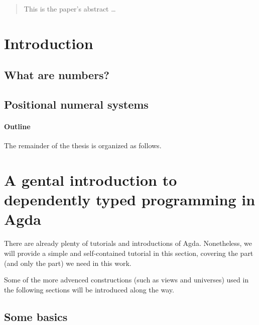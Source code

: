\documentclass[12pt, a4paper]{article}
\begin{document}
\maketitle

\begin{abstract}
This is the paper's abstract \ldots
\end{abstract}

\section{Introduction}


\subsection{What are numbers?}\label{num}


\subsection{Positional numeral systems}\label{pos}


\paragraph{Outline}
The remainder of the thesis is organized as follows.

\section{A gental introduction to dependently typed programming in Agda}\label{agda}

There are already plenty of tutorials and introductions of Agda\cite{norell2009dependently}.
Nonetheless, we will provide a simple and self-contained tutorial in this section,
covering the part (and only the part) we need in this work.

Some of the more advenced constructions (such as views and universes) used in
the following sections will be introduced along the way.

\subsection{Some basics}
\end{document}
